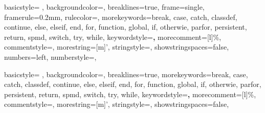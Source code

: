 {
    basicstyle= \ttfamily{}, %
    backgroundcolor=\color{background}, %
    breaklines=true, %
    frame=single,
    framerule=0.2mm, %
    rulecolor=\color{gray}, %
    morekeywords={break, case, catch, classdef, continue, else, elseif, end, for, function, global, if, otherwie, parfor, persistent, return, spmd, switch, try, while},
    keywordstyle=\color{blue}\textbf,
    morecomment=[l]{\%},
    commentstyle=\color{comment},
    morestring=[m]',
    stringstyle=\color{string},
    showstringspaces=false,
    numbers=left,
    numberstyle={\ttfamily{}\color{gray}}, %
}

{
    basicstyle= \ttfamily{}, %
    backgroundcolor=\color{background}, %
    breaklines=true, %
    morekeywords={break, case, catch, classdef, continue, else, elseif, end, for, function, global, if, otherwie, parfor, persistent, return, spmd, switch, try, while},
    keywordstyle=\color{blue}\textbf,
    morecomment=[l]{\%},
    commentstyle=\color{comment},
    morestring=[m]',
    stringstyle=\color{string},
    showstringspaces=false,
}
